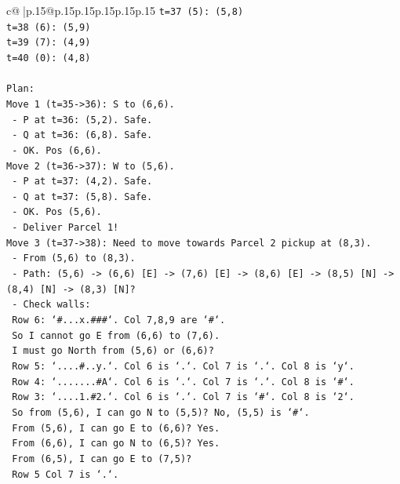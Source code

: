 \documentclass{article}
\begin{document}
{\begin{supertabular}{c@{$\;$}|p{.15\linewidth}@{}p{.15\linewidth}p{.15\linewidth}p{.15\linewidth}p{.15\linewidth}p{.15\linewidth}}
{{{\texttt{t=37 (5): (5,8)} \\
\texttt{t=38 (6): (5,9)} \\
\texttt{t=39 (7): (4,9)} \\
\texttt{t=40 (0): (4,8)} \\
\\ 
\texttt{Plan:} \\
\texttt{Move 1 (t=35{-}>36): S to (6,6).} \\
\texttt{  {-} P at t=36: (5,2). Safe.} \\
\texttt{  {-} Q at t=36: (6,8). Safe.} \\
\texttt{  {-} OK. Pos (6,6).} \\
\texttt{Move 2 (t=36{-}>37): W to (5,6).} \\
\texttt{  {-} P at t=37: (4,2). Safe.} \\
\texttt{  {-} Q at t=37: (5,8). Safe.} \\
\texttt{  {-} OK. Pos (5,6).} \\
\texttt{  {-} Deliver Parcel 1!} \\
\texttt{Move 3 (t=37{-}>38): Need to move towards Parcel 2 pickup at (8,3).} \\
\texttt{  {-} From (5,6) to (8,3).} \\
\texttt{  {-} Path: (5,6) {-}> (6,6) {[}E{]} {-}> (7,6) {[}E{]} {-}> (8,6) {[}E{]} {-}> (8,5) {[}N{]} {-}> (8,4) {[}N{]} {-}> (8,3) {[}N{]}?} \\
\texttt{  {-} Check walls:} \\
\texttt{    Row 6: `\#...x.\#\#\#`. Col 7,8,9 are `\#`.} \\
\texttt{    So I cannot go E from (6,6) to (7,6).} \\
\texttt{    I must go North from (5,6) or (6,6)?} \\
\texttt{    Row 5: `....\#..y.`. Col 6 is `.`. Col 7 is `.`. Col 8 is `y`.} \\
\texttt{    Row 4: `.......\#A`. Col 6 is `.`. Col 7 is `.`. Col 8 is `\#`.} \\
\texttt{    Row 3: `....1.\#2.`. Col 6 is `.`. Col 7 is `\#`. Col 8 is `2`.} \\
\texttt{    So from (5,6), I can go N to (5,5)? No, (5,5) is `\#`.} \\
\texttt{    From (5,6), I can go E to (6,6)? Yes.} \\
\texttt{    From (6,6), I can go N to (6,5)? Yes.} \\
\texttt{    From (6,5), I can go E to (7,5)?} \\
\texttt{      Row 5 Col 7 is `.`.} \\
}}}
\end{supertabular}}
\end{document}
